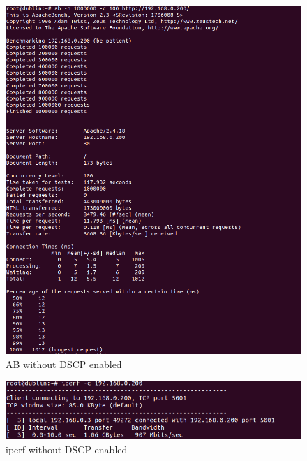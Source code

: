 \documentclass{article}
\begin{document}
\begin{figure}[H]
\centering
\includegraphics[width=15cm]{figures/q4-3-ab-no-dscp.png}
\caption{AB without DSCP enabled}
\centering
\label{fig:ad_no-dscp}
\end{figure}


\begin{figure}[H]
\centering
\includegraphics[width=15cm]{figures/q4-3-iperf-no-dscp.png}
\caption{iperf without DSCP enabled}
\centering
\label{fig:iperf_no-dscp}
\end{figure}
\end{document}
